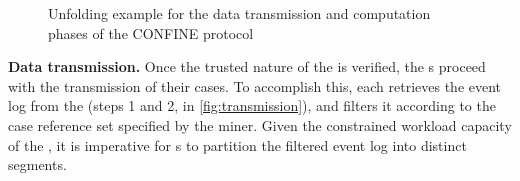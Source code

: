 \begin{figure}[t]
	\hfill
	\hfill	
	\caption{Unfolding example for the data transmission and computation phases of the CONFINE protocol}
	\label{fig:workflow}
\end{figure}
\noindent\textbf{Data transmission.} Once the trusted nature of the  is verified, the s proceed with the transmission of their cases. To accomplish this, each  retrieves the event log from the  (steps 1 and 2, in \cref{fig:transmission}), and filters it according to the case reference set specified by the miner. Given the constrained workload capacity of the , it is imperative for s to partition the filtered event log into distinct segments. %
